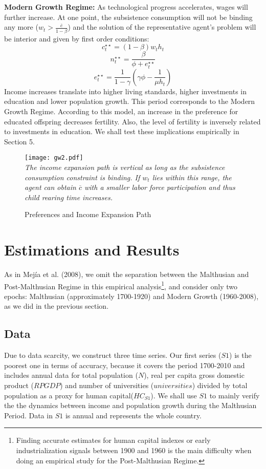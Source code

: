 \documentclass[12pt]{article}%
\begin{document}
\textbf{Modern Growth Regime:} As technological progress accelerates, wages will further increase. At one point, the subsistence consumption will not be binding any more ($w_{t}>\frac{\overline{c}}{1-\beta}$) and the solution of the representative agent's problem will be interior and given by first order conditions:
\begin{equation}\label{gw16}
c^{\star\star}_{t}=(1-\beta)w_{t}h_{t}
\end{equation}
\begin{equation}\label{gw17}
n^{\star\star}_{t}=\frac{\beta}{\phi+e^{\star\star}_{t}}
\end{equation}
\begin{equation}\label{gw18}
e^{\star\star}_{t}=\frac{1}{1-\gamma}(\gamma\phi-\frac{1}{\mu h_{t}})
\end{equation}
Income increases translate into higher living standards, higher investments in education and lower population growth. This period corresponds to the Modern Growth Regime. According to this model, an increase in the preference for educated offspring decreases fertility. Also, the level of fertility is inversely related to investments in education. We shall test these implications empirically in Section 5.
\begin{figure}[h]
\caption{Preferences and Income Expansion Path}
\centering
\texttt{[image: gw2.pdf]} \\
\footnotesize
\textit{The income expansion path is vertical as long as the subsistence consumption constraint is binding. If $w_{t}$ lies within this range, the agent can obtain $\overline{c}$ with a smaller labor force participation and thus child rearing time increases.}
\label{galorweil2}
\end{figure}
\section{Estimations and Results}
As in Mej\'ia et al. (2008), we omit the separation between the Malthusian and Post-Malthusian Regime in this empirical analysis\footnote{Finding accurate estimates for human capital indexes or early industrialization signals between 1900 and 1960 is the main difficulty when doing an empirical study for the Post-Malthusian Regime.}, and consider only two epochs: Malthusian (approximately 1700-1920) and Modern Growth (1960-2008), as we did in the previous section.
\subsection{Data}
Due to data scarcity, we construct three time series. Our first series ($S1$) is the poorest one in terms of accuracy, because it covers the period 1700-2010 and includes annual data for total population ($N$), real per capita gross domestic product ($RPGDP$) and number of universities ($universities$) divided by total population as a proxy for human capital($HC_{S1}$). We shall use $S1$ to mainly verify the the dynamics between income and population growth during the Malthusian Period. Data in $S1$ is annual and represents the whole country.
\end{document}
